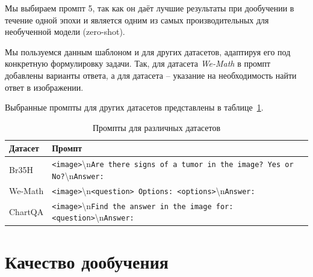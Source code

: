 \documentclass[LI,KR]{HSEUniversity}
\begin{document}
Мы выбираем промпт 5, так как он даёт лучшие результаты при дообучении в течение одной эпохи и является одним из самых производительных для необученной модели (zero-shot).

Мы пользуемся данным шаблоном и для других датасетов, адаптируя его под конкретную формулировку задачи.
Так, для датасета \textit{We-Math} в промпт добавлены варианты ответа,
а для датасета  – указание на необходимость найти ответ в изображении.

Выбранные промпты для других датасетов представлены в таблице~\ref{tab:prompts-datasets}.

\begin{table}[H]
\centering
\begin{tabular}{|l|l|}
\hline
\textbf{Датасет} & \textbf{Промпт} \\ \hline
Br35H & \small{\texttt{<image>}\textbackslash n\texttt{Are there signs of a tumor in the image? Yes or No?}\textbackslash n\texttt{Answer:}} \\ \hline
We-Math & \small{\texttt{<image>}\textbackslash n\texttt{<question> Options: <options>}\textbackslash n\texttt{Answer:}} \\ \hline
ChartQA & \small{\texttt{<image>}\textbackslash n\texttt{Find the answer in the image for: <question>}\textbackslash n\texttt{Answer:}} \\ \hline
\end{tabular}
\caption{Промпты для различных датасетов}
\label{tab:prompts-datasets}
\end{table}

\section{Качество дообучения}
\end{document}
